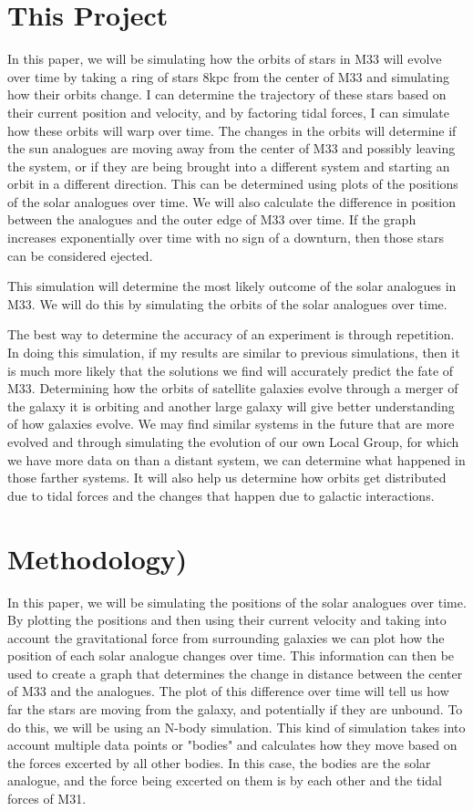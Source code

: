 \documentclass{aastex63}
\begin{document}
\section{This Project}
In this paper, we will be simulating how the orbits of stars in M33 will evolve over time by taking a ring of stars 8kpc from the center of M33 and simulating how their orbits change. I can determine the trajectory of these stars based on their current position and velocity, and by factoring tidal forces, I can simulate how these orbits will warp over time. The changes in the orbits will determine if the sun analogues are moving away from the center of M33 and possibly leaving the system, or if they are being brought into a different system and starting an orbit in a different direction. This can be determined using plots of the positions of the solar analogues over time. We will also calculate the difference in position between the analogues and the outer edge of M33 over time. If the graph increases exponentially over time with no sign of a downturn, then those stars can be considered ejected.

This simulation will determine the most likely outcome of the solar analogues in M33. We will do this by simulating the orbits of the solar analogues over time.

The best way to determine the accuracy of an experiment is through repetition. In doing this simulation, if my results are similar to previous simulations, then it is much more likely that the solutions we find will accurately predict the fate of M33. Determining how the orbits of satellite galaxies evolve through a merger of the galaxy it is orbiting and another large galaxy will give better understanding of how galaxies evolve. We may find similar systems in the future that are more evolved and through simulating the evolution of our own Local Group, for which we have more data on than a distant system, we can determine what happened in those farther systems. It will also help us determine how orbits get distributed due to tidal forces and the changes that happen due to galactic interactions.

\section{Methodology)}
In this paper, we will be simulating the positions of the solar analogues over time. By plotting the positions and then using their current velocity and taking into account the gravitational force from surrounding galaxies we can plot how the position of each solar analogue changes over time. This information can then be used to create a graph that determines the change in distance between the center of M33 and the analogues. The plot of this difference over time will tell us how far the stars are moving from the galaxy, and potentially if they are unbound. To do this, we will be using an N-body simulation. This kind of simulation takes into account multiple data points or "bodies" and calculates how they move based on the forces excerted by all other bodies. In this case, the bodies are the solar analogue, and the force being excerted on them is by each other and the tidal forces of M31.
\end{document}
